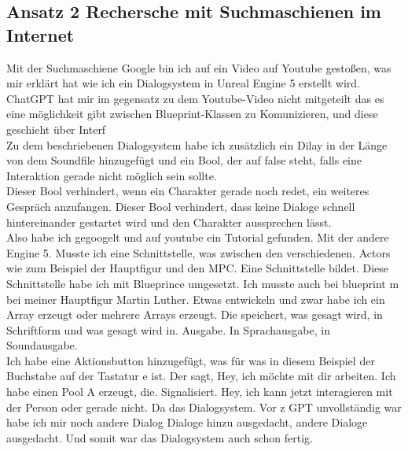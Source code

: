 \subsection{Ansatz 2 Rechersche mit Suchmaschienen im Internet}
Mit der Suchmaschiene Google bin ich auf ein Video auf Youtube gestoßen, was mir erklärt hat wie ich ein Dialogsystem in Unreal Engine 5 erstellt wird.
\\
ChatGPT hat mir im gegensatz zu dem Youtube-Video nicht mitgeteilt das es eine möglichkeit gibt zwischen Blueprint-Klassen zu Komunizieren, und diese geschieht über Interf
\\
Zu dem beschriebenen Dialogsystem habe ich zusätzlich ein Dilay in der Länge von dem Soundfile hinzugefügt und ein Bool, der auf false steht, falls eine Interaktion gerade nicht möglich sein sollte.
\\
Dieser Bool verhindert, wenn ein Charakter gerade noch redet, ein weiteres Gespräch anzufangen. Dieser Bool verhindert, dass keine Dialoge schnell hintereinander gestartet wird und den Charakter aussprechen lässt.
\\
Also habe ich gegoogelt und auf youtube ein Tutorial gefunden.  	 Mit der andere Engine 5. Musste ich eine Schnittstelle, was zwischen den verschiedenen.  Actors wie zum Beispiel der Hauptfigur und den MPC.  Eine Schnittstelle bildet.    		 Diese Schnittstelle habe ich mit Blueprince umgesetzt. Ich musste auch bei blueprint m bei meiner Hauptfigur Martin Luther.  	 Etwas entwickeln und zwar habe ich ein Array erzeugt oder mehrere Arrays erzeugt. Die speichert, was gesagt wird, in Schriftform und was gesagt wird in.   Ausgabe.  In Sprachausgabe, in Soundausgabe.
\\
Ich habe eine Aktionsbutton hinzugefügt, was für was in diesem Beispiel der Buchstabe auf der Tastatur e ist.  Der sagt, Hey, ich möchte mit dir arbeiten.		 Ich habe einen Pool A erzeugt, die. Signalisiert. Hey, ich kann jetzt interagieren mit der Person oder gerade nicht.   		 Da das Dialogsystem. Vor z GPT unvollständig war habe ich mir noch andere Dialog Dialoge hinzu ausgedacht, andere Dialoge ausgedacht.  Und somit war das Dialogsystem auch schon fertig.



